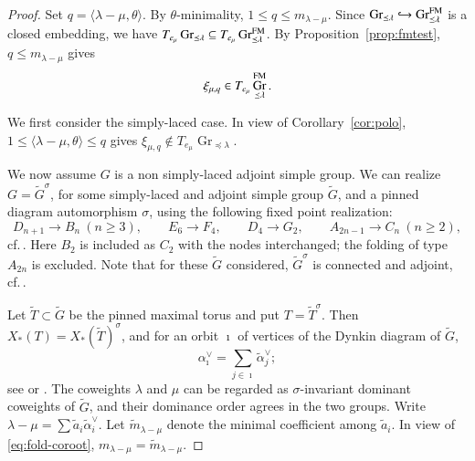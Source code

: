 \documentclass[a4paper, 12pt]{amsart}
\theoremstyle{definition}
\DeclareMathOperator{\Gr}{\mathrm{Gr}}
\begin{document}
\begin{proof}
Set $q=\langle\lambda-\mu,\theta\rangle$. By $\theta$-minimality,
$1\leq q\leq m_{\lambda-\mu}$.
Since  $\Gr_{\preceq\lambda} \hookrightarrow \Gr^{\rm FM}_{\preceq\lambda}$ is a closed embedding, we have $T_{e_\mu}\Gr_{\preceq\lambda}\subseteq T_{e_\mu}\Gr^{\rm FM}_{\preceq\lambda}$. By Proposition~\ref{prop:fmtest}, $q\le m_{\lambda-\mu}$ gives 
\begin{equation}\label{eq:incl}
 \xi_{\mu,q}\in T_{e_\mu}\Gr^{\rm FM}_{\preceq\lambda}.\end{equation}

\smallskip\noindent
We first consider the simply-laced case.  In view of Corollary~\ref{cor:polo}, $1\leq\langle\lambda-\mu,\theta\rangle\leq q$ gives $\xi_{\mu,q}\notin T_{e_\mu}\Gr_{\preceq\lambda}$.

\smallskip\noindent
We now assume $G$ is a non simply-laced adjoint simple group.  We can realize $G=\tilde{G}^\sigma$, for some simply-laced and adjoint simple group  $\tilde{G}$, and  a pinned diagram automorphism $\sigma$, using the following fixed point realization:
\[
D_{n+1}\longrightarrow B_n\ (n\geq3),\qquad
E_6\longrightarrow F_4,\qquad
D_4\longrightarrow G_2,\qquad
A_{2n-1}\longrightarrow C_n\ (n\geq2),
\]
cf.\,\cite[Section~2]{HongMV}.
Here $B_2$ is included as $C_2$ with the nodes interchanged;
the folding of type $A_{2n}$ is excluded. Note that for these $\tilde{G}$ considered,  $\tilde{G}^\sigma$ is connected and adjoint, cf.\,\cite[Propositions~1.30(1)]{DM}.

Let $\tilde{T}\subset\tilde{G}$ be
the pinned maximal torus and put $T=\tilde{T}^\sigma$.
Then
$X_*(T)=X_*(\tilde{T})^\sigma$, and for an orbit $\imath$ of vertices
of the Dynkin diagram of $\tilde{G}$,
\begin{equation}\label{eq:fold-coroot}
\alpha_{\imath}^\vee
=\sum_{j\in\imath}\tilde{\alpha}_j^\vee;
\end{equation}
see \cite[Proposition~2.1]{HongMV} or \cite[Lemma~2.2]{HongShen}. The coweights
 $\lambda$ and $\mu$ can be regarded as $\sigma$-invariant dominant coweights of $\tilde{G}$, and
their dominance order agrees in the two groups. Write $\lambda-\mu=\sum \tilde{a}_i \tilde{\alpha}_i^\vee$.  Let $\tilde{m}_{\lambda-\mu}$ denote the minimal coefficient among $\tilde{a}_i$. 
In view of \eqref{eq:fold-coroot}, $m_{\lambda-\mu}=\tilde{m}_{\lambda-\mu}$.


\end{proof}
\end{document}
